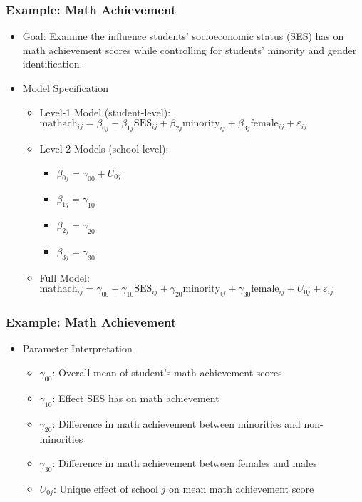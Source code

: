 \documentclass{beamer}
\begin{document}
\begin{frame}
	\frametitle{Example: Math Achievement}
		\begin{itemize}
			\item Goal: Examine the influence students' socioeconomic status (SES) has on math achievement scores while controlling for students' minority and gender identification.
			\item Model Specification
				\begin{itemize}
					\item Level-1 Model (student-level): $\mbox{mathach}_{ij}=\beta_{0j}+\beta_{1j}\mbox{SES}_{ij}+\beta_{2j}\mbox{minority}_{ij}+\beta_{3j}\mbox{female}_{ij}+\varepsilon_{ij}$
					\item Level-2 Models (school-level):
						\begin{itemize}
							\item $\beta_{0j}=\gamma_{00}+U_{0j}$
							\item $\beta_{1j}=\gamma_{10}$
							\item $\beta_{2j}=\gamma_{20}$
							\item $\beta_{3j}=\gamma_{30}$
						\end{itemize}
					\item Full Model: $\mbox{mathach}_{ij}=\gamma_{00}+\gamma_{10}\mbox{SES}_{ij}+\gamma_{20}\mbox{minority}_{ij}+\gamma_{30}\mbox{female}_{ij}+U_{0j}+\varepsilon_{ij}$
				\end{itemize}
		\end{itemize}
\end{frame}

\begin{frame}
	\frametitle{Example: Math Achievement}
		\begin{itemize}
			\item Parameter Interpretation
				\begin{itemize}
					\item $\gamma_{00}$: Overall mean of student's math achievement scores
					\item $\gamma_{10}$: Effect SES has on math achievement
					\item $\gamma_{20}$: Difference in math achievement between minorities and non-minorities
					\item $\gamma_{30}$: Difference in math achievement between females and males
					\item $U_{0j}$: Unique effect of school $j$ on mean math achievement score
				\end{itemize}
		\end{itemize}
\end{frame}
\end{document}
